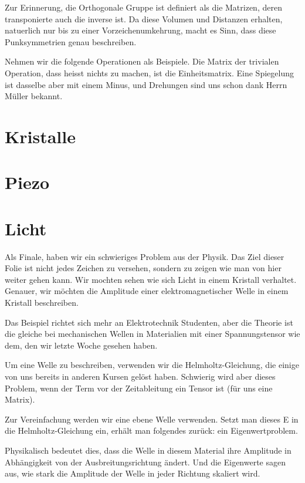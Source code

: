 \documentclass[a4paper]{article}
\newcommand{\scene}[1]{\par\noindent[ #1 ]\par}
\begin{document}
Zur Erinnerung, die Orthogonale Gruppe ist definiert als die Matrizen, deren
transponierte auch die inverse ist. Da diese Volumen und Distanzen erhalten,
natuerlich nur bis zu einer Vorzeichenumkehrung, macht es Sinn, dass diese
Punksymmetrien genau beschreiben.

Nehmen wir die folgende Operationen als Beispiele. Die Matrix der trivialen
Operation, dass heisst nichts zu machen, ist die Einheitsmatrix. Eine
Spiegelung ist dasselbe aber mit einem Minus, und Drehungen sind uns schon
dank Herrn M\"uller bekannt.

\section{Kristalle}
\scene{Spontan}

\section{Piezo}
\scene{Spontan}

\section{Licht}
Als Finale, haben wir ein schwieriges Problem aus der Physik. Das Ziel dieser
Folie ist nicht jedes Zeichen zu versehen, sondern zu zeigen wie man von hier
weiter gehen kann. Wir mochten sehen wie sich Licht in einem Kristall verhaltet.
Genauer, wir m\"ochten die Amplitude einer
elektromagnetischer Welle in einem Kristall beschreiben.

Das Beispiel richtet sich mehr an Elektrotechnik Studenten, aber die Theorie
ist die gleiche bei mechanischen Wellen in Materialien mit einer
Spannungstensor wie dem, den wir letzte Woche gesehen haben.

Um eine Welle zu beschreiben, verwenden wir die Helmholtz-Gleichung, die einige
von uns bereits in anderen Kursen gel\"ost haben.  Schwierig wird aber dieses
Problem, wenn der Term vor der Zeitableitung ein Tensor ist (f\"ur uns eine Matrix).

Zur Vereinfachung werden wir eine ebene Welle verwenden. Setzt man dieses E in
die Helmholtz-Gleichung ein, erhält man folgendes zurück: ein Eigenwertproblem.

Physikalisch bedeutet dies, dass die Welle in diesem Material ihre Amplitude in
Abhängigkeit von der Ausbreitungsrichtung ändert.  Und die Eigenwerte sagen
aus, wie stark die Amplitude der Welle in jeder Richtung skaliert wird.
\end{document}
